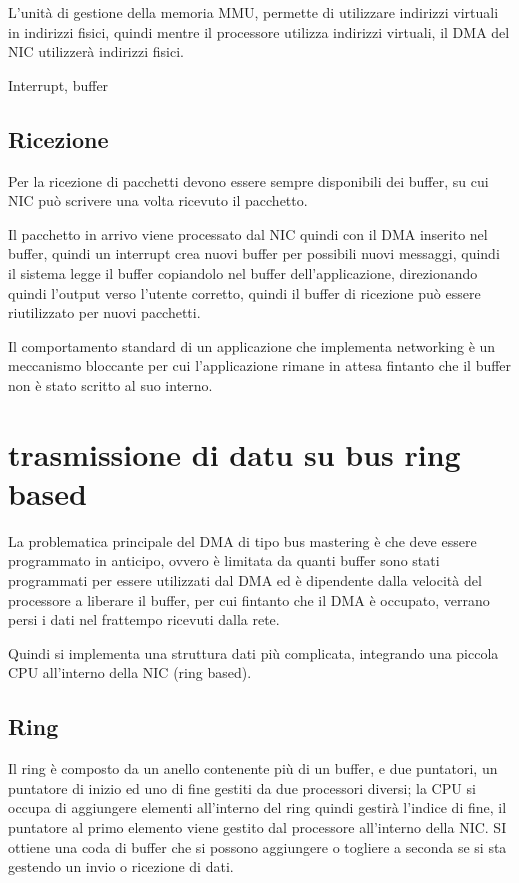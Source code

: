 L'unità di gestione della memoria MMU,
permette di utilizzare indirizzi virtuali in indirizzi fisici,
quindi mentre il processore utilizza indirizzi virtuali,
il DMA del NIC utilizzerà indirizzi fisici.

Interrupt, buffer
\subsection{Ricezione}
Per la ricezione di pacchetti devono essere sempre disponibili dei buffer,
su cui NIC può scrivere una volta ricevuto il pacchetto.

Il pacchetto in arrivo viene processato dal NIC quindi con il DMA inserito nel buffer,
quindi un interrupt crea nuovi buffer per possibili nuovi messaggi,
quindi il sistema legge il buffer copiandolo nel buffer dell'applicazione,
direzionando quindi l'output verso l'utente corretto,
quindi il buffer di ricezione può essere riutilizzato per nuovi pacchetti.

Il comportamento standard di un applicazione che implementa networking è un
meccanismo bloccante per cui l'applicazione rimane in attesa fintanto che il
buffer non è stato scritto al suo interno.

\section{trasmissione di datu su bus ring based}
La problematica principale del DMA di tipo bus mastering è che deve essere
programmato in anticipo, ovvero è limitata da quanti buffer sono stati programmati
per essere utilizzati dal DMA ed è dipendente dalla velocità del processore a
liberare il buffer, per cui fintanto che il DMA è occupato, verrano persi i
dati nel frattempo ricevuti dalla rete.


Quindi si implementa una struttura dati più complicata, integrando una piccola
CPU all'interno della NIC (ring based).
\subsection{Ring}
Il ring è composto da un anello contenente più di un buffer, e due puntatori,
un puntatore di inizio ed uno di fine gestiti da due processori diversi;
la CPU si occupa di aggiungere elementi all'interno del ring quindi gestirà
l'indice di fine, il puntatore al primo elemento viene gestito dal processore
all'interno della NIC.
SI ottiene una coda di buffer che si possono aggiungere o togliere a seconda
se si sta gestendo un invio o ricezione di dati.

